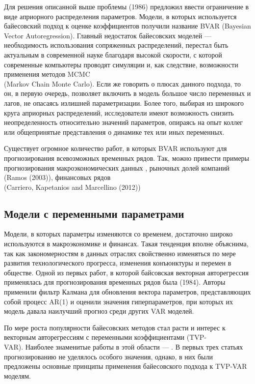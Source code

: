 Для решения описанной выше проблемы  (1986) предложил ввести ограничение в виде априорного распределения параметров. Модели, в которых используется байесовский подход к оценке коэффициентов получили название BVAR (Bayesian Vector Autoregression). Главный недостаток байесовских моделей --- необходимость использования сопряженных распределений, перестал быть актуальным в современной науке благодаря высокой скорости, с которой современные компьютеры проводят симуляции и, как следствие, возможности применения методов MCMC\\ (Markov Chain Monte Carlo). Если же говорить о плюсах данного подхода, то он, в первую очередь, позволяет включить в модель большое число переменных и лагов, не опасаясь излишней параметризации. Более того, выбирая из широкого круга априорных распределений, исследователи имеют возможность снизить неопределенность относительно значений параметров, опираясь на опыт коллег или общепринятые представления о динамике тех или иных переменных.

Существует огромное количество работ, в которых BVAR используют для прогнозирования всевозможных временных рядов. Так, можно привести примеры прогнозирования макроэкономических данных , рыночных долей компаний (Ramos (2003)), финансовых рядов \\(Carriero, Kapetanios and Marcellino (2012))

\subsection{Модели с переменными параметрами}
Модели, в которых параметры изменяются со временем, достаточно широко используются в макроэкономике и финансах. Такая тенденция вполне объяснима, так как закономерностям в данных отраслях свойственно изменяться по мере развития технологического прогресса, изменения конъюнктуры и перемен в обществе.
Одной из первых работ, в которой байсовская векторная авторегрессия применялась для прогнозирования временных рядов была  (1984). Авторы применили фильтр Калмана для обновления вектора параметров, представляющих собой процесс AR(1) и оценили значения гиперпараметров, при которых их модель давала наилучший прогноз среди других VAR моделей. 

По мере роста популярности байесовских методов стал расти и интерес к векторным авторегрессиям с переменными коэффициентами (TVP-\\VAR). Наиболее знаменитые работы в этой области --- . В первых трех статьях прогнозированию не уделялось особого значения, однако, в них были предложены основные принципы применения байесовского подхода к TVP-VAR моделям.

